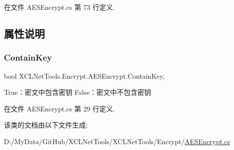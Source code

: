 在文件 A\+E\+S\+Encrypt.\+cs 第 73 行定义.



\subsection{属性说明}
\mbox{\label{class_x_c_l_net_tools_1_1_encrypt_1_1_a_e_s_encrypt_aff7c2c090ff50543aa60c0c5895b8a1e}} 
\subsubsection{\texorpdfstring{Contain\+Key}{ContainKey}}
{\footnotesize\ttfamily bool X\+C\+L\+Net\+Tools.\+Encrypt.\+A\+E\+S\+Encrypt.\+Contain\+Key\hspace{0.3cm}{\ttfamily [get]}, {\ttfamily [set]}}



True：密文中包含密钥 False：密文中不包含密钥 



在文件 A\+E\+S\+Encrypt.\+cs 第 29 行定义.



该类的文档由以下文件生成\+:\begin{DoxyCompactItemize}
\item 
D\+:/\+My\+Data/\+Git\+Hub/\+X\+C\+L\+Net\+Tools/\+X\+C\+L\+Net\+Tools/\+Encrypt/\hyperlink{_a_e_s_encrypt_8cs}{A\+E\+S\+Encrypt.\+cs}\end{DoxyCompactItemize}
